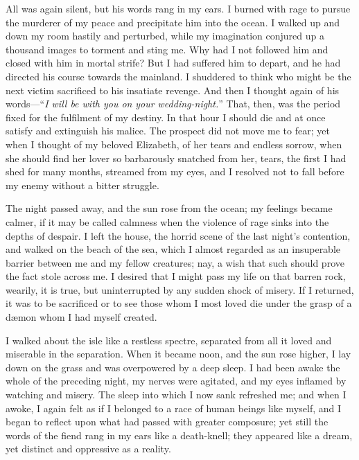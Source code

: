 \documentclass[12pt,openright]{book}
\begin{document}
All was again silent, but his words rang in my ears. I burned with rage to pursue the murderer of my peace and precipitate him into the ocean. I walked up and down my room hastily and perturbed, while my imagination conjured up a thousand images to torment and sting me. Why had I not followed him and closed with him in mortal strife? But I had suffered him to depart, and he had directed his course towards the mainland. I shuddered to think who might be the next victim sacrificed to his insatiate revenge. And then I thought again of his words—“\textit{I will be with you on}\textit{ }\textit{your wedding-night.}” That, then, was the period fixed for the fulfilment of my destiny. In that hour I should die and at once satisfy and extinguish his malice. The prospect did not move me to fear; yet when I thought of my beloved Elizabeth, of her tears and endless sorrow, when she should find her lover so barbarously snatched from her, tears, the first I had shed for many months, streamed from my eyes, and I resolved not to fall before my enemy without a bitter struggle.

The night passed away, and the sun rose from the ocean; my feelings became calmer, if it may be called calmness when the violence of rage sinks into the depths of despair. I left the house, the horrid scene of the last night’s contention, and walked on the beach of the sea, which I almost regarded as an insuperable barrier between me and my fellow creatures; nay, a wish that such should prove the fact stole across me. I desired that I might pass my life on that barren rock, wearily, it is true, but uninterrupted by any sudden shock of misery. If I returned, it was to be sacrificed or to see those whom I most loved die under the grasp of a dæmon whom I had myself created.

I walked about the isle like a restless spectre, separated from all it loved and miserable in the separation. When it became noon, and the sun rose higher, I lay down on the grass and was overpowered by a deep sleep. I had been awake the whole of the preceding night, my nerves were agitated, and my eyes inflamed by watching and misery. The sleep into which I now sank refreshed me; and when I awoke, I again felt as if I belonged to a race of human beings like myself, and I began to reflect upon what had passed with greater composure; yet still the words of the fiend rang in my ears like a death-knell; they appeared like a dream, yet distinct and oppressive as a reality.
\end{document}
